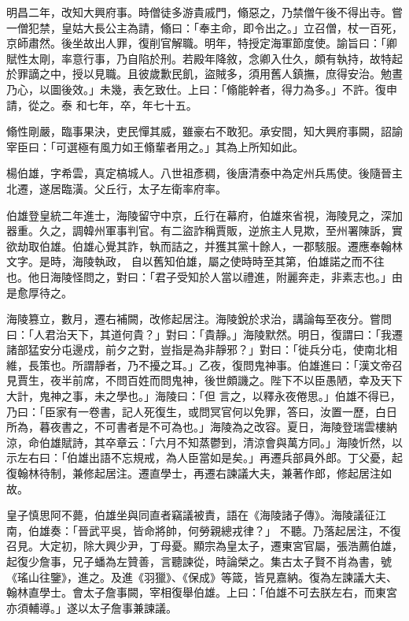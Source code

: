 \begin{pinyinscope}
 明昌二年，改知大興府事。時僧徒多游貴戚門，翛惡之，乃禁僧午後不得出寺。嘗一僧犯禁，皇姑大長公主為請，翛曰：「奉主命，即令出之。」立召僧，杖一百死，京師肅然。後坐故出人罪，復削官解職。明年，特授定海軍節度使。諭旨曰：「卿賦性太剛，率意行事，乃自陷於刑。若殿年降敘，念卿入仕久，頗有執持，故特起於罪謫之中，授以見職。且彼歲歉民飢，盜賊多，須用舊人鎮撫，庶得安治。勉晝乃心，以圖後效。」未幾，表乞致仕。上曰：「翛能幹者，得力為多。」不許。復申請，從之。泰
 和七年，卒，年七十五。



 翛性剛嚴，臨事果決，吏民憚其威，雖豪右不敢犯。承安間，知大興府事闕，詔諭宰臣曰：「可選極有風力如王翛輩者用之。」其為上所知如此。



 楊伯雄，字希雲，真定槁城人。八世祖彥稠，後唐清泰中為定州兵馬使。後隨晉主北遷，遂居臨潢。父丘行，太子左衛率府率。



 伯雄登皇統二年進士，海陵留守中京，丘行在幕府，伯雄來省視，海陵見之，深加器重。久之，調韓州軍事判官。有二盜詐稱賈販，逆旅主人見欺，至州署陳訴，實欲劫取伯雄。伯雄心覺其詐，執而詰之，并獲其黨十餘人，一郡駭服。遷應奉翰林文字。是時，海陵執政，
 自以舊知伯雄，屬之使時時至其第，伯雄諾之而不往也。他日海陵怪問之，對曰：「君子受知於人當以禮進，附麗奔走，非素志也。」由是愈厚待之。



 海陵篡立，數月，遷右補闕，改修起居注。海陵銳於求治，講論每至夜分。嘗問曰：「人君治天下，其道何貴？」對曰：「貴靜。」海陵默然。明日，復謂曰：「我遷諸部猛安分屯邊戍，前夕之對，豈指是為非靜邪？」對曰：「徙兵分屯，使南北相維，長策也。所謂靜者，乃不擾之耳。」乙夜，復問鬼神事。伯雄進曰：「漢文帝召見賈生，夜半前席，不問百姓而問鬼神，後世頗譏之。陛下不以臣愚陋，幸及天下大計，鬼神之事，未之學也。」海陵曰：「但
 言之，以釋永夜倦思。」伯雄不得已，乃曰：「臣家有一卷書，記人死復生，或問冥官何以免罪，答曰，汝置一歷，白日所為，暮夜書之，不可書者是不可為也。」海陵為之改容。夏日，海陵登瑞雲樓納涼，命伯雄賦詩，其卒章云：「六月不知蒸鬱到，清涼會與萬方同。」海陵忻然，以示左右曰：「伯雄出語不忘規戒，為人臣當如是矣。」再遷兵部員外郎。丁父憂，起復翰林待制，兼修起居注。遷直學士，再遷右諫議大夫，兼著作郎，修起居注如故。



 皇子慎思阿不薨，伯雄坐與同直者竊議被責，語在《海陵諸子傳》。海陵議征江南，伯雄奏：「晉武平吳，皆命將帥，何勞親總戎律？」
 不聽。乃落起居注，不復召見。大定初，除大興少尹，丁母憂。顯宗為皇太子，遷東宮官屬，張浩薦伯雄，起復少詹事，兄子蟠為左贊善，言聽諫從，時論榮之。集古太子賢不肖為書，號《瑤山往鑒》，進之。及進《羽獵》、《保成》等箴，皆見嘉納。復為左諫議大夫、翰林直學士。會太子詹事闕，宰相復舉伯雄。上曰：「伯雄不可去朕左右，而東宮亦須輔導。」遂以太子詹事兼諫議。




\end{pinyinscope}

